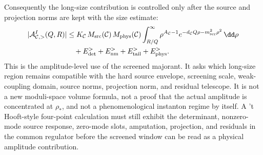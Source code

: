 \begin{controlledapproximation}
Consequently the long-size contribution is controlled only after the source
and projection norms are kept with the size estimate:
\begin{equation}
\begin{aligned}
  |\mathcal A^I_{\mathcal C,>}(Q,R)|
  &\le
  K_{\mathcal C}\,
  M_{\rm src}(\mathcal C)\,
  M_{\rm phys}(\mathcal C)
  \int_{R/Q}^{\infty}
    \rho^{A_{\mathcal C}-1}
    e^{-d_{\mathcal C}Q\rho-m_{\rm scr}^2\rho^2}
    \,\dd\rho                                      \\
  &\quad
  +E_{\rm det}^{>}+E_{\rm nm}^{>}+E_{\rm tail}^{>}+E_{\rm phys}^{>} .
\end{aligned}
  \label{eq:instanton-hard-screened-window-bound}
\end{equation}
This is the amplitude-level use of the screened majorant.  It asks which
long-size region remains compatible with the hard source envelope, screening
scale, weak-coupling domain, source norms, projection norm, and residual
telescope.  It is not a new moduli-space volume formula, not a proof that the
actual amplitude is concentrated at \(\rho_*\), and not a phenomenological
instanton regime by itself.
A 't Hooft-style four-point calculation must still exhibit the determinant,
nonzero-mode source response, zero-mode slots, amputation, projection, and
residuals in the common regulator before the screened window can be read as a
physical amplitude contribution.
\end{controlledapproximation}

